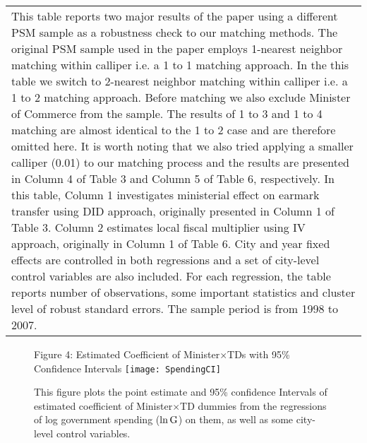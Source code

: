 \documentclass[11pt,a4paper]{article}
\begin{document}
\begin{center}
\begin{scriptsize}
{\begin{tabular}{l*{2}{c}}
\multicolumn{3}{p{8.5cm}}{\footnotesize This table reports two major results of the paper using a different PSM sample as a robustness check to our matching methods. The original PSM sample used in the paper employs 1-nearest neighbor matching within calliper i.e. a 1 to 1 matching approach. In the this table we switch to 2-nearest neighbor matching within calliper i.e. a 1 to 2 matching approach. Before matching we also exclude Minister of Commerce from the sample. The results of 1 to 3 and 1 to 4 matching are almost identical to the 1 to 2 case and are therefore omitted here. It is worth noting that we also tried applying a smaller calliper (0.01) to our matching process and the results are presented in Column 4 of Table 3 and Column 5 of Table 6, respectively. In this table, Column 1 investigates ministerial effect on earmark transfer using DID approach, originally presented in Column 1 of Table 3. Column 2 estimates local fiscal multiplier using IV approach, originally in Column 1 of Table 6. City and year fixed effects are controlled in both regressions and a set of city-level control variables are also included. For each regression, the table reports number of observations, some important statistics and cluster level of robust standard errors. The sample period is from 1998 to 2007.}\\
\end{tabular}
}
\end{scriptsize}
\end{center}



\newpage

\begin{figure}[htb]
\centering
Figure 4: Estimated Coefficient of Minister\(\times\)TDs with 95\% Confidence Intervals
\texttt{[image: SpendingCI]}
\caption{This figure plots the point estimate and 95\% confidence Intervals of estimated coefficient of Minister\(\times\)TD dummies from the regressions of log government spending (\(\rm \ln{G}  \)) on them, as well as some city-level control variables.}
\end{figure}
\end{document}
